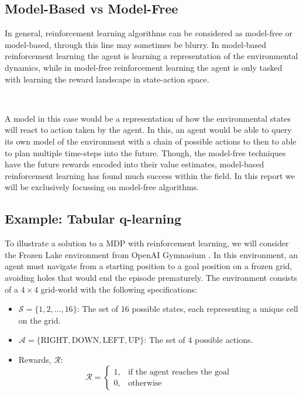 \documentclass{article}
\begin{document}
\subsection{Model-Based vs Model-Free}

In general, reinforcement learning algorithms can be considered as model-free or model-based, through this line may sometimes be blurry. In model-based reinforcement learning the agent is learning a representation of the environmental dynamics, while in model-free reinforcement learning the agent is only tasked with learning the reward landscape in state-action space.

\

A model in this case would be a representation of how the environmental states will react to action taken by the agent. In this, an agent would be able to query its own model of the environment with a chain of possible actions to then to able to plan multiple time-steps into the future. Though, the model-free techniques have the future rewards encoded into their value estimates, model-based reinforcement learning has found much success within the field. \citep{moerland2022model} In this report we will be exclusively focussing on model-free algorithms.

\subsection{Example: Tabular q-learning}

To illustrate a solution to a MDP with reinforcement learning, we will consider the Frozen Lake environment from OpenAI Gymnasium \citep{kwiatkowski2024gymnasium}. In this environment, an agent must navigate from a starting position to a goal position on a frozen grid, avoiding holes that would end the episode prematurely. The environment consists of a \(4 \times 4\) grid-world with the following specifications:

\begin{itemize}
    \item \(\mathcal{S} = \{1, 2, \dots, 16\}\): The set of 16 possible states, each representing a unique cell on the grid.
    \item \(\mathcal{A} = \{\text{RIGHT}, \text{DOWN}, \text{LEFT}, \text{UP}\}\): The set of 4 possible actions.
    \item Rewards, \(\mathcal{R}\):
    $$
    \mathcal{R} = \begin{cases}
        1, & \text{if the agent reaches the goal} \\
        0, & \text{otherwise}
    \end{cases}
    $$
\end{itemize}
\end{document}
